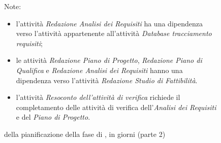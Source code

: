 \pagebreak
\begin{figure}[H]
\label{tab:genweeks2}
\caption{ della pianificazione della fase di \AR, in giorni (parte 2)}

Note:
\begin{itemize}
\item l'attività \emph{Redazione Analisi dei Requisiti} ha una dipendenza verso l'attività  appartenente all'attività \emph{Database tracciamento requisiti};
\item le attività \emph{Redazione Piano di Progetto}, \emph{Redazione Piano di Qualifica} e \emph{Redazione Analisi dei Requisiti} hanno una dipendenza verso l'attività \emph{Redazione Studio di Fattibilità}.
\item l'attività \emph{Resoconto dell'attività di verifica} richiede il completamento delle attività di verifica dell'\emph{Analisi dei Requisiti} e del \emph{Piano di Progetto}.
\end{itemize} 
\end{figure}
		
